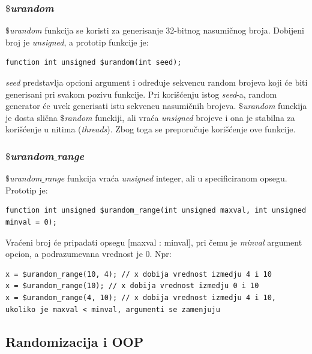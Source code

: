\subsubsection{\emph{\(\$\)urandom}}

\emph{\(\$\)urandom} funkcija se koristi za generisanje 32-bitnog nasumičnog broja. Dobijeni broj je \emph{unsigned}, a prototip funkcije je:

\begin{lstlisting}
function int unsigned $urandom(int seed);
\end{lstlisting}

\emph{seed} predstavlja opcioni argument i određuje sekvencu random brojeva
koji će biti generisani pri svakom pozivu funkcije. Pri korišćenju istog
\emph{seed}-a, random generator će uvek generisati istu sekvencu nasumičnih
brojeva. \emph{\(\$\)urandom} funckija je dosta slična \emph{\(\$\)random}
funckiji, ali vraća \emph{unsigned} brojeve i ona je stabilna za korišćenje u
nitima (\emph{threads}). Zbog toga se preporučuje korišćenje ove funkcije.

\subsubsection{\emph{\(\$\)urandom\(\_\)range}}

\emph{\(\$\)urandom\(\_\)range} funkcija vraća \emph{unsigned} integer, ali u
specificiranom opsegu. Prototip je:

\begin{lstlisting}
function int unsigned $urandom_range(int unsigned maxval, int unsigned minval = 0);
\end{lstlisting}

Vraćeni broj će pripadati opsegu [maxval : minval], pri čemu je \emph{minval}
argument opcion, a podrazumevana vrednost je 0. Npr:

\begin{lstlisting}
x = $urandom_range(10, 4); // x dobija vrednost izmedju 4 i 10
x = $urandom_range(10); // x dobija vrednost izmedju 0 i 10
x = $urandom_range(4, 10); // x dobija vrednost izmedju 4 i 10, ukoliko je maxval < minval, argumenti se zamenjuju
\end{lstlisting}


\subsection{Randomizacija i OOP}

